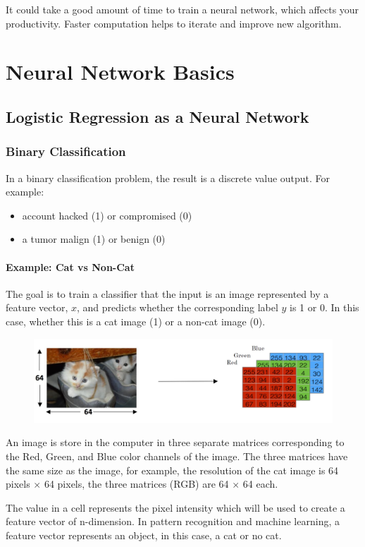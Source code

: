\documentclass[UTF8]{article}
\begin{document}
It could take a good amount of time to train a neural network, which affects your productivity.
Faster computation helps to iterate and improve new algorithm.

\section{Neural Network Basics}
\subsection{Logistic Regression as a Neural Network}
\subsubsection{Binary Classification}
In a binary classification problem, the result is a discrete value output. For example:
\begin{itemize}
    \item account hacked (1) or compromised (0)
    \item a tumor malign (1) or benign (0)
\end{itemize}

\paragraph{Example: Cat vs Non-Cat}
The goal is to train a classifier that the input is an image represented by a feature vector,
$x$, and predicts whether the corresponding label $y$ is 1 or 0. In this case,
whether this is a cat image (1) or a non-cat image (0).

\begin{figure}[htb]
    \centering
    \includegraphics[width=35em]{figures/cat}
\end{figure}
An image is store in the computer in three separate matrices corresponding to the Red, Green, and
Blue color channels of the image. The three matrices have the same size as the image, for example,
the resolution of the cat image is 64 pixels $\times$ 64 pixels, the three matrices (RGB) are 64
$\times$ 64 each.

The value in a cell represents the pixel intensity which will be used to create a feature vector of
n-dimension. In pattern recognition and machine learning, a feature vector represents an object, in
this case, a cat or no cat.
\end{document}
